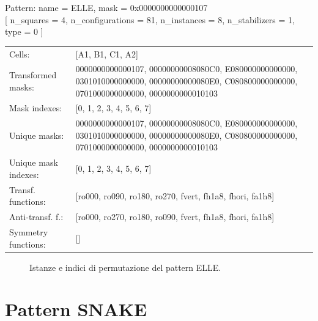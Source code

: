 \begin{tcolorbox}[sharp corners, fontupper=\ttfamily\small, colback=white]
  \noindent Pattern: name = ELLE, mask = 0x0000000000000107\\
  {[} n\_squares = 4, n\_configurations = 81,
  n\_instances = 8, n\_stabilizers = 1, type = 0 { ]}\\[1.0ex]
  \begin{tabularx}{\textwidth}{@{} p{3.5cm} X @{}}
    Cells:               & {[}A1, B1, C1, A2{]}\\[0.5ex]
    Transformed masks:   & 0000000000000107, 00000000008080C0, E080000000000000, 0301010000000000, 00000000000080E0, C080800000000000, 0701000000000000, 0000000000010103\\[0.5ex]
    Mask indexes:        & {[}0, 1, 2, 3, 4, 5, 6, 7{]}\\[0.5ex]
    Unique masks:        & 0000000000000107, 00000000008080C0, E080000000000000, 0301010000000000, 00000000000080E0, C080800000000000, 0701000000000000, 0000000000010103\\[0.5ex]
    Unique mask indexes: & {[}0, 1, 2, 3, 4, 5, 6, 7{]}\\[0.5ex]
    Transf. functions:   & {[}ro000, ro090, ro180, ro270, fvert, fh1a8, fhori, fa1h8{]}\\[0.5ex]
    Anti-transf. f.:     & {[}ro000, ro270, ro180, ro090, fvert, fh1a8, fhori, fa1h8{]}\\[0.5ex]
    Symmetry functions:  & {[}{]}\\[0.5ex]
  \end{tabularx}
\end{tcolorbox}

\begin{figure}[htbp]
  \centering
   \hfill
   \hfill
   \hfill
  \vspace{0.3cm}
   \hfill
   \hfill
   \hfill
  \caption{Istanze e indici di permutazione del pattern ELLE.}
\end{figure}

\newpage

\section{Pattern SNAKE}

